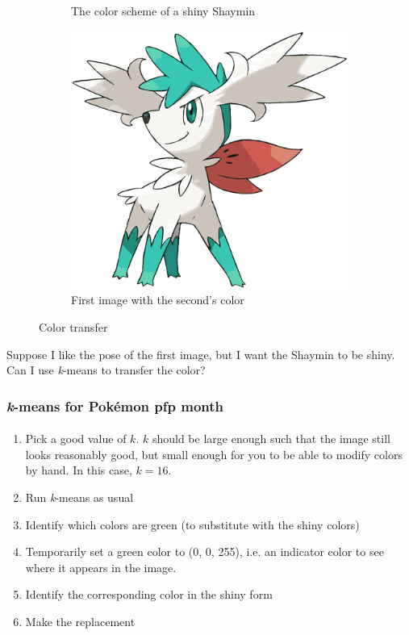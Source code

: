 \documentclass{beamer}                             %
\begin{document}
\begin{frame}
\begin{figure}[h!]
\begin{subfigure}[h]{0.3 \textwidth}
      \caption{The color scheme of a shiny Shaymin}
    \end{subfigure}
    \hfill
    \begin{subfigure}[h]{0.3 \textwidth}
      \includegraphics[scale=0.1]{shaymin.png}
      \caption{First image with the second's color}
    \end{subfigure}
    \caption{Color transfer}
\end{figure}

Suppose I like the pose of the first image, but I want the Shaymin to be shiny.
Can I use \textit{k}-means to transfer the color?
\end{frame}

\begin{frame}
\frametitle{\textit{k}-means for Pokémon pfp month}
\framesubtitle{}

\begin{enumerate}
  \item Pick a good value of \( k \). \( k \) should be large enough such that
    the image still looks reasonably good, but small enough for you to be able
    to modify colors by hand. In this case, \( k = 16 \).
  \item Run \textit{k}-means as usual
  \item Identify which colors are green (to substitute with the shiny colors) 
  \item Temporarily set a green color to (0, 0, 255),
    i.e. an indicator color to see where it appears in the image.
  \item Identify the corresponding color in the shiny form
  \item Make the replacement 
\end{enumerate}
\end{frame}
\end{document}
